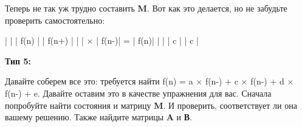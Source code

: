 \vspace{\baselineskip}
Теперь не так уж трудно составить \textbf{M}. Вот как это делается, но не забудьте проверить самостоятельно:

\vspace{\baselineskip}
\begin{tcolorbox}
|\hspace{1,5mm}  \hspace{3mm}   \hspace{3mm}  \hspace{0,5mm}| \hspace{10,5mm}| \hspace{3mm} f(n) \hspace{3mm}|\hspace{16mm} |\hspace*{2,5mm} f(n+)\hspace*{2,9mm} |\newline
|\hspace{1,5mm} \hspace{5,8mm}\hspace{5,6mm}\hspace{0,6mm} |\hspace*{3mm} $\times$\hspace{3mm}     |\hspace*{2,5mm} f(n-)\hspace*{2,9mm}|\hspace{5mm} = \hspace*{5mm}    |\hspace*{6mm} f(n)\hspace*{6mm}|\newline
|\hspace{1,5mm}  \hspace{3mm}   \hspace{3mm}  \hspace{0,5mm}| \hspace{10,7mm}| \hspace{5,5mm} c \hspace{5,5mm}|\hspace{16mm} |\hspace*{7,1mm} c \hspace*{7,1mm} |
\end{tcolorbox}


\vspace{\baselineskip}
\textbf{Тип 5:}

\vspace{\baselineskip}
Давайте соберем все это: требуется найти f(n) = a $\times$ f(n-) + c $\times$ f(n-) + d $\times$ f(n-) + e. Давайте оставим это в качестве упражнения для вас. Сначала попробуйте найти состояния и матрицу \textbf{M}. И проверить, соответствует ли она вашему решению. Также найдите матрицы \textbf{A} и \textbf{В}.

